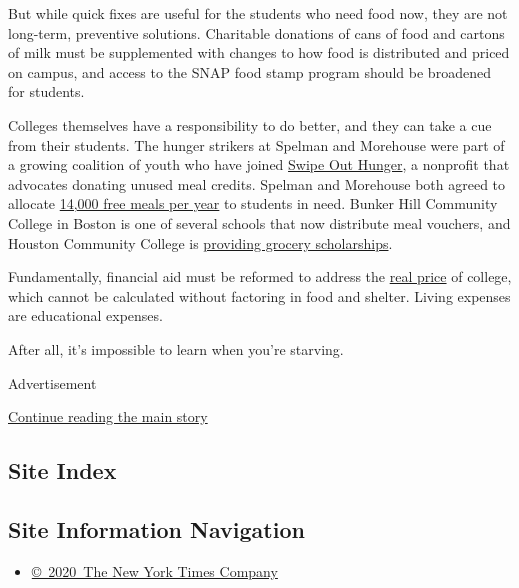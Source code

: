 But while quick fixes are useful for the students who need food now,
they are not long-term, preventive solutions. Charitable donations of
cans of food and cartons of milk must be supplemented with changes to
how food is distributed and priced on campus, and access to the SNAP
food stamp program should be broadened for students.

Colleges themselves have a responsibility to do better, and they can
take a cue from their students. The hunger strikers at Spelman and
Morehouse were part of a growing coalition of youth who have joined
\href{http://www.swipehunger.org/}{Swipe Out Hunger}, a nonprofit that
advocates donating unused meal credits. Spelman and Morehouse both
agreed to allocate
\href{https://thegrio.com/2017/11/11/morehouse-spelman-students-hunger-strike-ends-free-meals-campus/}{14,000
free meals per year} to students in need. Bunker Hill Community College
in Boston is one of several schools that now distribute meal vouchers,
and Houston Community College is
\href{http://wihopelab.com/publications/Addressing-Basic-Needs-Security-in-Higher-Education.pdf}{providing
grocery scholarships}.

Fundamentally, financial aid must be reformed to address the
\href{https://tcf.org/content/report/the-real-price-of-college/}{real
price} of college, which cannot be calculated without factoring in food
and shelter. Living expenses are educational expenses.

After all, it's impossible to learn when you're starving.

Advertisement

\protect\hyperlink{after-bottom}{Continue reading the main story}

\hypertarget{site-index}{%
\subsection{Site Index}\label{site-index}}

\hypertarget{site-information-navigation}{%
\subsection{Site Information
Navigation}\label{site-information-navigation}}

\begin{itemize}
\tightlist
\item
  \href{https://help.nytimes3xbfgragh.onion/hc/en-us/articles/115014792127-Copyright-notice}{©~2020~The
  New York Times Company}
\end{itemize}

